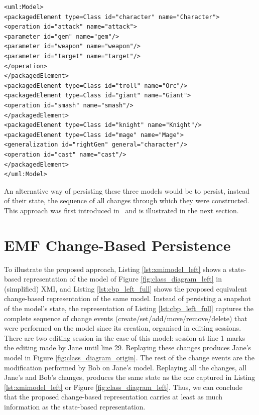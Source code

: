 \begin{lstlisting}[style=xmi,caption={Simplified XMI file of the right version of Figure \ref{fig:class_diagram_right}.},label=lst:xmimodel_right]
<uml:Model>
<packagedElement type=Class id="character" name="Character">
<operation id="attack" name="attack">
<parameter id="gem" name="gem"/>
<parameter id="weapon" name="weapon"/>
<parameter id="target" name="target"/>
</operation>
</packagedElement>
<packagedElement type=Class id="troll" name="Orc"/>
<packagedElement type=Class id="giant" name="Giant">
<operation id="smash" name="smash"/>
</packagedElement>
<packagedElement type=Class id="knight" name="Knight"/>
<packagedElement type=Class id="mage" name="Mage">
<generalization id="rightGen" general="character"/>
<operation id="cast" name="cast"/>
</packagedElement>
</uml:Model>
\end{lstlisting}

An alternative way of persisting these three models would be to persist, instead of their state, the sequence of all changes through which they were constructed. This approach was first introduced in~\cite{DBLP:conf/models/YohannisKP17} and is illustrated in the next section.


\section{EMF Change-Based Persistence}
\label{sec:emf_change_based_persistence}

To illustrate the proposed approach, Listing \ref{lst:xmimodel_left} shows a state-based representation of the model of Figure \ref{fig:class_diagram_left} in (simplified) XMI, and Listing \ref{lst:cbp_left_full} shows the proposed equivalent change-based representation of the same model. Instead of persisting a snapshot of the model's state, the representation of Listing \ref{lst:cbp_left_full} captures the complete sequence of change events (create/set/add/move/remove/delete) that were performed on the model since its creation, organised in editing sessions. There are two editing session in the case of this model: session at line 1 marks the editing made by Jane until line 29. Replaying these changes produces Jane's model in Figure \ref{fig:class_diagram_origin}. The rest of the change events are the modification performed by Bob on Jane's model. Replaying all the changes, all Jane's and Bob's changes, produces the same state as the one captured in Listing \ref{lst:xmimodel_left} or Figure \ref{fig:class_diagram_left}. Thus, we can conclude that the proposed change-based representation carries at least as much information as the state-based representation. 

